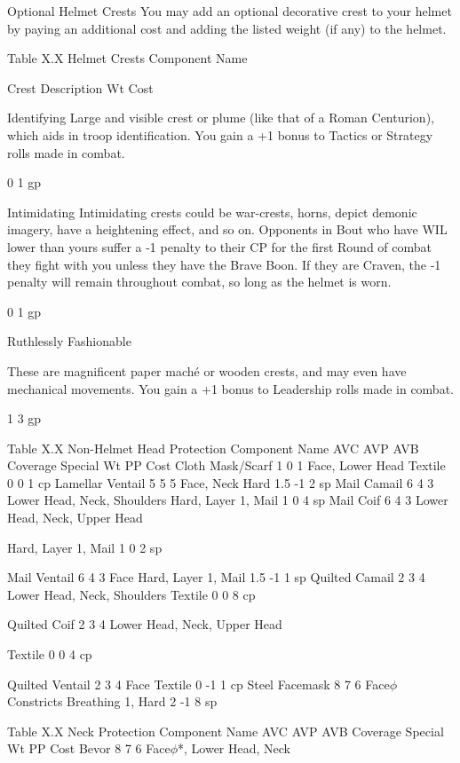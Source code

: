 \documentclass[oneside,11pt,english]{book}
\begin{document}
 

 

Optional Helmet Crests 
You may add an optional decorative crest to your helmet by paying an additional cost and adding the 
listed weight (if any) to the helmet. 

 

Table X.X Helmet Crests 
Component 
Name 

Crest Description Wt Cost 

Identifying Large and visible crest or plume (like that of a Roman Centurion), which aids in troop 
identification. You gain a +1 bonus to Tactics or Strategy rolls made in combat. 

0 1 gp 

Intimidating Intimidating crests could be war-crests, horns, depict demonic imagery, have a heightening 
effect, and so on. Opponents in Bout who have WIL lower than yours suffer a -1 penalty to their 
CP for the first Round of combat they fight with you unless they have the Brave Boon. If they 
are Craven, the -1 penalty will remain throughout combat, so long as the helmet is worn. 

0 1 gp 

Ruthlessly 
Fashionable 

These are magnificent paper maché or wooden crests, and may even have mechanical 
movements. You gain a +1 bonus to Leadership rolls made in combat. 

1 3 gp 

 
Table X.X Non-Helmet Head Protection 
Component Name AVC AVP AVB Coverage Special Wt PP Cost 
Cloth Mask/Scarf 1 0 1 Face, Lower Head Textile 0 0 1 cp 
Lamellar Ventail 5 5 5 Face, Neck Hard 1.5 -1 2 sp 
Mail Camail 6 4 3 Lower Head, Neck, Shoulders Hard, Layer 1, Mail 1 0 4 sp 
Mail Coif 6 4 3 Lower Head, Neck, 
Upper Head 

Hard, Layer 1, Mail 1 0 2 sp 

Mail Ventail 6 4 3 Face Hard, Layer 1, Mail 1.5 -1 1 sp 
Quilted Camail 2 3 4 Lower Head, Neck, Shoulders Textile 0 0 8 cp 


Quilted Coif 2 3 4 Lower Head, Neck, 
Upper Head 

Textile 0 0 4 cp 

Quilted Ventail 2 3 4 Face Textile 0 -1 1 cp 
Steel Facemask 8 7 6 Face$\phi$ Constricts Breathing 1, Hard 2 -1 8 sp 

 
Table X.X Neck Protection 
Component Name AVC AVP AVB Coverage Special Wt PP Cost 
Bevor 8 7 6 Face$\phi$*, Lower Head, 
Neck 
\end{document}
